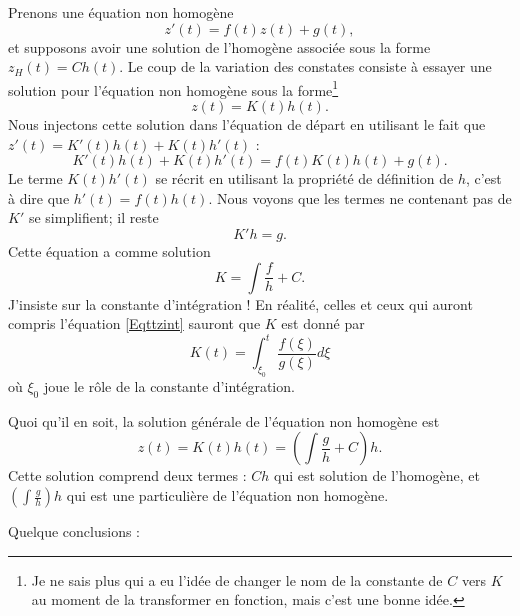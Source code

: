 Prenons une équation non homogène 
\begin{equation}        \label{EqAstNNHomo}
    z'(t)=f(t)z(t)+g(t),
\end{equation}
et supposons avoir une solution de l'homogène associée sous la forme $z_H(t)=Ch(t)$. Le coup de la variation des constates consiste à essayer une solution pour l'équation non homogène sous la forme\footnote{Je ne sais plus qui a eu l'idée de changer le nom de la constante de $C$ vers $K$ au moment de la transformer en fonction, mais c'est une bonne idée.}
\begin{equation}
    z(t)=K(t)h(t).
\end{equation}
Nous injectons cette solution dans l'équation de départ en utilisant le fait que $z'(t)=K'(t)h(t)+K(t)h'(t)$ :
\begin{equation}
    K'(t)h(t)+K(t)h'(t)=f(t)K(t)h(t)+g(t).
\end{equation}
Le terme $K(t)h'(t)$ se récrit en utilisant la propriété de définition de $h$, c'est à dire que $h'(t)=f(t)h(t)$. Nous voyons que les termes ne contenant pas de $K'$ se simplifient; il reste
\begin{equation}
    K'h=g.
\end{equation}
Cette équation a comme solution
\begin{equation}
    K=\int \frac{ f }{ h }+C.
\end{equation}
J'insiste sur la constante d'intégration ! En réalité, celles et ceux qui auront compris l'équation \eqref{Eqttzint} sauront que $K$ est donné par
\begin{equation}
    K(t)=\int_{\xi_0}^{t}\frac{ f(\xi) }{ g(\xi) }d\xi
\end{equation}
où $\xi_0$ joue le rôle de la constante d'intégration.

Quoi qu'il en soit, la solution générale de l'équation non homogène est
\begin{equation}        \label{EqSolVarCosntCool}
    z(t)=K(t)h(t)=\left( \int\frac{ g }{ h }+C \right)h.
\end{equation}
Cette solution comprend deux termes : $Ch$ qui est solution de l'homogène, et $\left( \int \frac{ g }{ h } \right)h$ qui est une particulière de l'équation non homogène.

Quelque conclusions :

